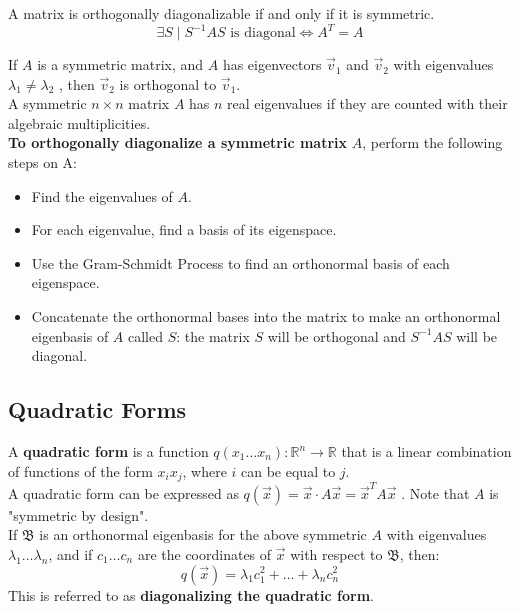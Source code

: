 \documentclass[]{scrartcl}
\begin{document}
	 A matrix is orthogonally diagonalizable if and only if it is symmetric.
	$$
	\exists S \mid S^{-1}AS \text{ is diagonal} \iff A^T = A 
	$$
	
	 If $A$ is a symmetric matrix, and $A$ has eigenvectors $\vec{v}_1$ and $\vec{v}_2$ with eigenvalues $\lambda_1 \neq \lambda_2$ , then $\vec{v}_2$ is orthogonal to $\vec{v}_1$.\\
	
	 A symmetric $n \times n$ matrix $A$ has $n$ real eigenvalues if they are counted with their algebraic multiplicities.\\
	 
	 \textbf{To orthogonally diagonalize a symmetric matrix} $A$, perform the following steps on A:
	 \begin{itemize}
	 	\item Find the eigenvalues of $A$.
	 	\item For each eigenvalue, find a basis of its eigenspace.
	 	\item Use the Gram-Schmidt Process to find an orthonormal basis of each eigenspace.
	 	\item Concatenate the orthonormal bases into the matrix to make an orthonormal eigenbasis of $A$ called $S$: the matrix $S$ will be orthogonal and $S^{-1}AS$ will be diagonal.
	 \end{itemize}
	
	\subsection{Quadratic Forms}
	A \textbf{quadratic form} is a function $q(x_1 \ldots x_n): \mathbb{R}^n \rightarrow \mathbb{R}$ that is a linear combination of functions of the form $x_i x_j$, where $i$ can be equal to $j$.\\
	
	A quadratic form can be expressed as $q(\vec{x}) = \vec{x} \cdot A\vec{x} = \vec{x}^T A\vec{x}$ . Note that $A$ is "symmetric by design".\\
	
	If $\mathfrak{B}$ is an orthonormal eigenbasis for the above symmetric $A$ with eigenvalues $\lambda_1 \ldots \lambda_n$, and if $c_1 \ldots c_n$ are the coordinates of $\vec{x}$ with respect to $\mathfrak{B}$, then:
	$$
	q(\vec{x}) = \lambda_1 c^2_1 + \ldots + \lambda_n c^2_n
	$$
	This is referred to as \textbf{diagonalizing the quadratic form}.\\
	
\end{document}
